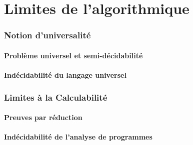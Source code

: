 \documentclass[9pt, handout]{beamer}
\begin{document}
 
\part{Limites de l'algorithmique}
 
 
\section{Notion d'universalité}
 
\subsection{Problème universel et semi-décidabilité}






 
\subsection{Indécidabilité du langage universel}





 
\section{Limites à la Calculabilité}
 
\subsection{Preuves par réduction}





 
\subsection{Indécidabilité de l'analyse de programmes}






 
\end{document}
